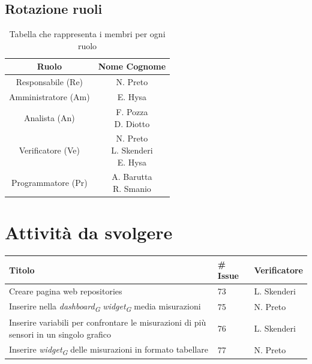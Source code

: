 \documentclass{article}
\begin{document}
    \subsection{Rotazione ruoli}
    \begin{table}[H]
        \centering
        \begin{tabular}{|c|c|} 
            \hline
            \textbf{Ruolo} & \textbf{Nome Cognome} \\
            \hline \hline
            Responsabile (Re) & N. Preto \\ 
            \hline
            Amministratore (Am) & E. Hysa \\ 
            \hline
            Analista (An) & \makecell{F. Pozza\\D. Diotto} \\
            \hline
            Verificatore (Ve) & \makecell{N. Preto\\L. Skenderi\\E. Hysa} \\
            \hline
            Programmatore (Pr) & \makecell{A. Barutta\\R. Smanio} \\
            \hline
        \end{tabular}
        \caption{Tabella che rappresenta i membri per ogni ruolo}
    \end{table}

\section{Attività da svolgere}
    \begin{center}
        \begin{tabular}{|C{7cm}|C{1,5cm}|C{3cm}|}
            \hline
            \textbf{Titolo} & \textbf{\# Issue} & \textbf{Verificatore} \\
            \hline\hline
            Creare pagina web repositories & 73 & L. Skenderi \\
            Inserire nella \textit{dashboard}\textsubscript{\textit{G}} \textit{widget}\textsubscript{\textit{G}} media misurazioni & 75 & N. Preto \\
            Inserire variabili per confrontare le misurazioni di più sensori in un singolo grafico & 76 & L. Skenderi \\
            Inserire \textit{widget}\textsubscript{\textit{G}} delle misurazioni in formato tabellare  & 77 & N. Preto \\
            \hline
        \end{tabular}
    \end{center}
\end{document}
